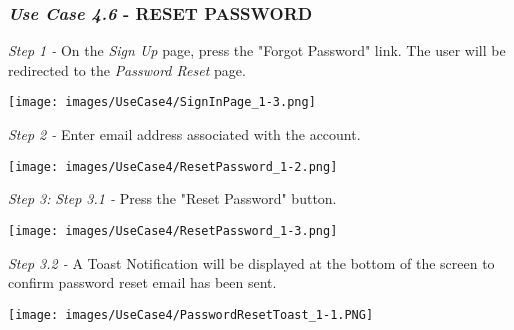 \documentclass[11pt]{article}
\begin{document}
        \subsubsection{\textit{Use Case 4.6} - \uppercase{Reset Password}}
        \textit{Step 1 -} On the \textit{Sign Up} page, press the "Forgot Password" link. The user will be redirected to the \textit{Password Reset} page.\\[0.5cm]
        \begin{center}
            \texttt{[image: images/UseCase4/SignInPage\_1-3.png]}
        \end{center}
        \textit{Step 2 -} Enter email address associated with the account.\\[0.5cm]
        \begin{center}
            \texttt{[image: images/UseCase4/ResetPassword\_1-2.png]}
        \end{center}
        \textit{Step 3:}
        \textit{Step 3.1 -} Press the "Reset Password" button.\\[0.5cm]
        \begin{center}
            \texttt{[image: images/UseCase4/ResetPassword\_1-3.png]}
        \end{center}
        \textit{Step 3.2 -} A Toast Notification will be displayed at the bottom of the screen to confirm password reset email has been sent.\\[0.5cm]
        \begin{center}
            \texttt{[image: images/UseCase4/PasswordResetToast\_1-1.PNG]}
        \end{center}
\end{document}
